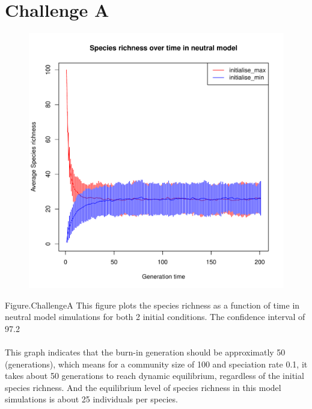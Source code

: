 \documentclass[12pt,a4paper]{article}
\begin{document}
\section{Challenge A}
\begin{figure}[h]
\centering
\includegraphics[width=\textwidth]{challengeA.pdf}
\end{figure}
Figure.ChallengeA This figure plots the species richness as a function of time in neutral model simulations for both 2 initial
conditions. The confidence interval of 97.2%
\\
\\
This graph indicates that the burn-in generation should be approximatly 50 (generations), 
which means for a community size of 100 and speciation rate 0.1, it takes about 50 generations to reach dynamic equilibrium, regardless of the initial species richness.
And the equilibrium level of species richness in this model simulations is about 25 individuals per species.



\newpage
\end{document}
